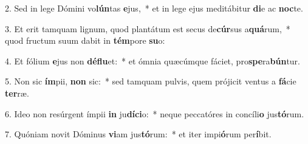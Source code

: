 2. Sed in lege Dómini vo\textbf{lún}tas \textbf{e}jus,~*  et in lege ejus meditábitur \textbf{di}e ac \textbf{noc}te.\

3. Et erit tamquam lignum, quod plantátum est secus de\textbf{cúr}sus a\textbf{quá}rum,~*  quod fructum suum dabit in \textbf{tém}pore \textbf{su}o:\

4. Et fólium \textbf{e}jus non \textbf{dé}\textbf{flu}et:~*  et ómnia quæcúmque fáciet, pro\textbf{spe}ra\textbf{bún}tur.\

5. Non sic \textbf{ím}pii, \textbf{non} sic:~*  sed tamquam pulvis, quem prójicit ventus a \textbf{fá}cie \textbf{ter}ræ.\

6. Ideo non resúrgent ímpii \textbf{in} ju\textbf{dí}\textbf{ci}o:~*  neque peccatóres in concíli\textbf{o} jus\textbf{tó}rum.\

7. Quóniam novit Dóminus \textbf{vi}am jus\textbf{tó}rum:~*  et iter impi\textbf{ó}rum per\textbf{í}bit.\

